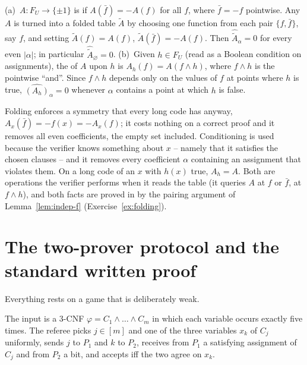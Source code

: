 \begin{definition}\label{def:folding}
(a)~$A\colon F_U\to\{\pm1\}$ is  if $A(\bar f)=-A(f)$ for all $f$, where $\bar f=-f$ pointwise.  Any $A$ is turned into a folded table $\tilde A$ by choosing one function from each pair $\{f,\bar f\}$, say $f$, and setting $\tilde A(f)=A(f)$, $\tilde A(\bar f)=-A(f)$.  Then $\widehat{\tilde A}_\alpha=0$ for every even $|\alpha|$; in particular $\widehat{\tilde A}_\varnothing=0$.
(b)~Given $h\in F_U$ (read as a Boolean condition on assignments), the  of $A$ upon $h$ is $A_h(f)=A(f\wedge h)$, where $f\wedge h$ is the pointwise ``and''.  Since $f\wedge h$ depends only on the values of $f$ at points where $h$ is true, $\widehat{(A_h)}_\alpha=0$ whenever $\alpha$ contains a point at which $h$ is false.
\end{definition}

\noindent
Folding enforces a symmetry that every long code has anyway, $A_x(\bar f)=-f(x)=-A_x(f)$; it costs nothing on a correct proof and it removes all even coefficients, the empty set included.  Conditioning is used because the verifier knows something about $x$ -- namely that it satisfies the chosen clauses -- and it removes every coefficient $\alpha$ containing an assignment that violates them.  On a long code of an $x$ with $h(x)$ true, $A_h=A$.  Both are operations the verifier performs when it reads the table (it queries $A$ at $f$ or $\bar f$, at $f\wedge h$), and both facts are proved in \cite[Section~2.5]{Hastad01} by the pairing argument of Lemma~\ref{lem:indep-f} (Exercise~\ref{ex:folding}).


\section{The two-prover protocol and the standard written proof}
\label{sec:swp}

Everything rests on a game that is deliberately weak.

\begin{definition}\label{def:basic-protocol}
The input is a $3$-CNF $\varphi=C_1\wedge\dots\wedge C_m$ in which each variable occurs exactly five times.  The referee picks $j\in[m]$ and one of the three variables $x_k$ of $C_j$ uniformly, sends $j$ to $P_1$ and $k$ to $P_2$, receives from $P_1$ a satisfying assignment of $C_j$ and from $P_2$ a bit, and accepts iff the two agree on $x_k$.
\end{definition}

